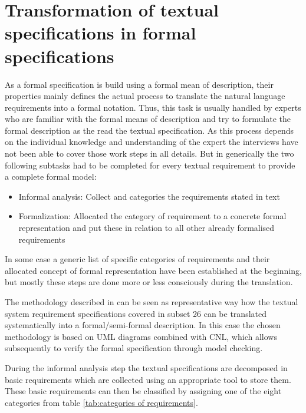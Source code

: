 \documentclass{./template/openetcs_report}
\begin{document}
\section{Transformation of textual specifications in formal specifications}

As a formal specification is build using a formal mean of description, their properties mainly defines the actual process to translate the natural language requirements into a formal notation. Thus, this task is usually handled by experts who are familiar with the formal means of description and try to formulate the formal description as the read the textual specification. As this process depends on the individual knowledge and understanding of the expert the interviews have not been able to cover those work steps in all details. But in generically the two following subtasks had to be completed for every textual requirement to provide a complete formal model:
\begin{itemize}
\item Informal analysis: Collect and categories the requirements stated in text
\item Formalization: Allocated the category of requirement to a concrete formal representation and put these in relation to all other already formalised requirements
\end{itemize}

In some case a generic list of specific categories of requirements and their allocated concept of formal representation have been established at the beginning, but mostly these steps are done more or less consciously during the translation. 

The methodology described in \citep{Cimatti.2008c} can be seen as representative way how the textual system requirement specifications covered in subset 26 can be translated systematically into a formal/semi-formal description. In this case the chosen methodology is based on UML diagrams combined with CNL, which allows subsequently to verify the formal specification through model checking.

During the informal analysis step the textual specifications are decomposed in basic requirements which are collected using an appropriate tool to store them. These basic requirements can then be classified by assigning one of the eight categories from table \ref{tab:categories of requirements}.
\end{document}
